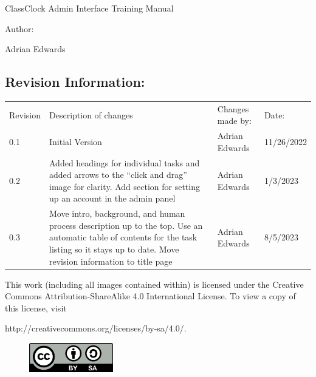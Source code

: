 \documentclass{article}
\author{Adrian Edwards}
\date{2023-08-06}
\begin{document}
\clearpage
{ClassClock Admin Interface Training Manual}

{Author:}

{Adrian Edwards}


\bigskip


\bigskip


\bigskip


\bigskip

\subsection{Revision Information:}
\begin{flushleft}
\tablefirsthead{}
\tablehead{}
\tabletail{}
\tablelasttail{}
\begin{supertabular}{m{0.5462598in}m{3.35316in}m{1.4233599in}m{0.8615598in}}
{Revision} &
{Description of changes} &
{Changes made by:} &
{Date:}\\
{0.1} &
{Initial Version} &
{Adrian Edwards} &
{11/26/2022}\\
{0.2} &
{Added headings for individual tasks and added arrows to the “click and drag” image for
clarity. Add section for setting up an account in the admin panel} &
{Adrian Edwards} &
{1/3/2023}\\
{0.3} &
{Move intro, background, and human process description up to the top. Use an automatic table of
contents for the task listing so it stays up to date. Move revision information to title page} &
{Adrian Edwards} &
{8/5/2023}\\
\end{supertabular}
\end{flushleft}

\bigskip


\bigskip


\bigskip

{This work (including all images contained within) is licensed under the Creative Commons Attribution-ShareAlike 4.0
International License. To view a copy of this license, visit}

{http://creativecommons.org/licenses/by-sa/4.0/.}



\begin{figure}
\includegraphics[width=1.439in,height=0.5043in]{Mini20Manual-img001.png}\end{figure}
\setcounter{tocdepth}{3}
\tableofcontents
\end{document}
